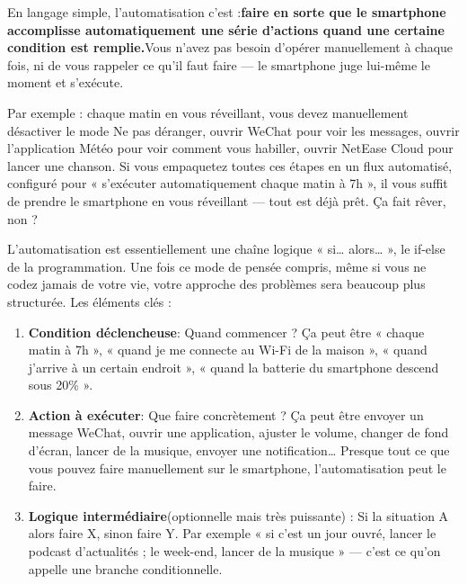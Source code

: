 


En langage simple, l'automatisation c'est :\textbf{faire en sorte que le smartphone accomplisse automatiquement une série d'actions quand une certaine condition est remplie.}Vous n'avez pas besoin d'opérer manuellement à chaque fois, ni de vous rappeler ce qu'il faut faire — le smartphone juge lui-même le moment et s'exécute.

Par exemple : chaque matin en vous réveillant, vous devez manuellement désactiver le mode Ne pas déranger, ouvrir WeChat pour voir les messages, ouvrir l'application Météo pour voir comment vous habiller, ouvrir NetEase Cloud pour lancer une chanson. Si vous empaquetez toutes ces étapes en un flux automatisé, configuré pour « s'exécuter automatiquement chaque matin à 7h », il vous suffit de prendre le smartphone en vous réveillant — tout est déjà prêt. Ça fait rêver, non ?

L'automatisation est essentiellement une chaîne logique « si… alors… », le if-else de la programmation. Une fois ce mode de pensée compris, même si vous ne codez jamais de votre vie, votre approche des problèmes sera beaucoup plus structurée. Les éléments clés :

\begin{enumerate}
  \item \textbf{Condition déclencheuse}: Quand commencer ? Ça peut être « chaque matin à 7h », « quand je me connecte au Wi-Fi de la maison », « quand j'arrive à un certain endroit », « quand la batterie du smartphone descend sous 20\% ».
  \item \textbf{Action à exécuter}: Que faire concrètement ? Ça peut être envoyer un message WeChat, ouvrir une application, ajuster le volume, changer de fond d'écran, lancer de la musique, envoyer une notification… Presque tout ce que vous pouvez faire manuellement sur le smartphone, l'automatisation peut le faire.
  \item \textbf{Logique intermédiaire}(optionnelle mais très puissante) : Si la situation A alors faire X, sinon faire Y. Par exemple « si c'est un jour ouvré, lancer le podcast d'actualités ; le week-end, lancer de la musique » — c'est ce qu'on appelle une branche conditionnelle.
\end{enumerate}

